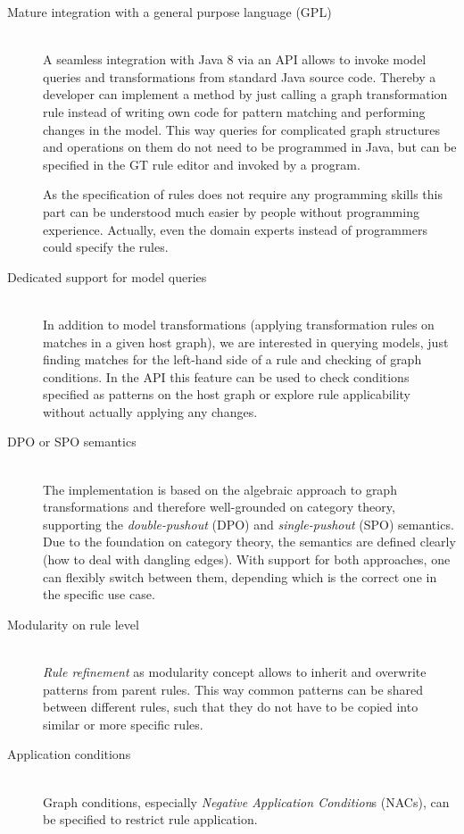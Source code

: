 \begin{description}
	\item[Mature integration with a general purpose language (GPL)] ~\\
		A seamless integration with Java 8 via an API allows to invoke model queries and transformations from standard Java source code.
		Thereby a developer can implement a method by just calling a graph transformation rule instead of writing own code for pattern matching and performing changes in the model.
		This way queries for complicated graph structures and operations on them do not need to be programmed in Java, but can be specified in the GT rule editor and invoked by a program.

		As the specification of rules does not require any programming skills this part can be understood much easier by people without programming experience.
		Actually, even the domain experts instead of programmers could specify the rules.

	\item[Dedicated support for model queries] ~\\
		In addition to model transformations (\ie applying transformation rules on matches in a given host graph), we are interested in querying models, \ie just finding matches for the left-hand side of a rule and checking of graph conditions.
		In the API this feature can be used to check conditions specified as patterns on the host graph or explore rule  	applicability without actually applying any changes.

	\item[DPO or SPO semantics] ~\\
		The implementation is based on the algebraic approach to graph transformations and therefore well-grounded on category theory, \eg supporting the \textit{double-pushout} (DPO) and \textit{single-pushout} (SPO) semantics.
		Due to the foundation on category theory, the semantics are defined clearly (\eg how to deal with dangling edges).
		With support for both approaches, one can flexibly switch between them, depending which is the correct one in the specific use case.

	\item[Modularity on rule level] ~\\
		\textit{Rule refinement} as modularity concept allows to inherit and overwrite patterns from parent rules.
		This way common patterns can be shared between different rules, such that they do not have to be copied into similar or more specific rules.

	\item[Application conditions] ~\\
		Graph conditions, especially \textit{Negative Application Condition}s (NACs), can be specified to restrict rule application.


\end{description}
